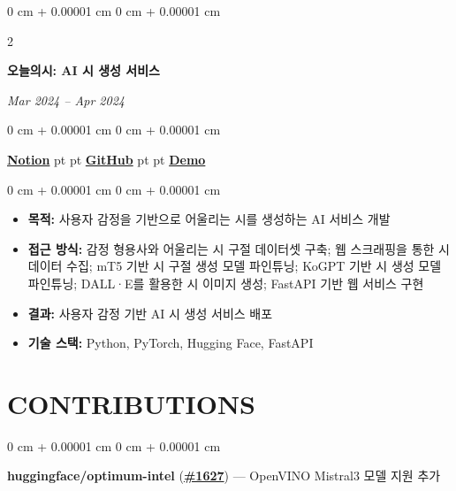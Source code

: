 \documentclass[10pt, letterpaper]{article}
\newenvironment{highlights}{
    \begin{itemize}[
        topsep=0.10 cm,
        parsep=0.10 cm,
        partopsep=0pt,
        itemsep=0pt,
        leftmargin=0 cm + 10pt
    ]
}{
    \end{itemize}
} %
\newenvironment{onecolentry}{
    \begin{adjustwidth}{
        0 cm + 0.00001 cm
    }{
        0 cm + 0.00001 cm
    }
}{
    \end{adjustwidth}
} %
\newenvironment{twocolentry}[2][]{
    \onecolentry
    \def\secondColumn{\textit{#2}}
    \setcolumnwidth{\fill, 4.5 cm}
    \begin{paracol}{2}
}{
    \switchcolumn \raggedleft \secondColumn
    \end{paracol}
    \endonecolentry
} %
\begin{document}
        \vspace{0.2 cm}
        \begin{twocolentry}{
            Mar 2024 -- Apr 2024
        }
            \textbf{오늘의시: AI 시 생성 서비스}
        \end{twocolentry}
        \begin{onecolentry}
            \href{https://awake-kumquat-803.notion.site/AI-1b674ec8f703804c9374e31d42b913a7?source=copy_link}{\textbf{Notion}}
             pt
            \AND
             pt
            \href{https://github.com/boostcampaitech6/level2-3-nlp-finalproject-nlp-05}{\textbf{GitHub}}
             pt
            \AND
             pt
            \href{https://drive.google.com/file/d/1Posof2hvXHmEOwdVl48xTVUwrTU4mYpS/view?usp=drive_link}{\textbf{Demo}}
        \end{onecolentry}

        \vspace{0.10 cm}
        \begin{onecolentry}
            \begin{highlights}
                \item \textbf{목적:} 사용자 감정을 기반으로 어울리는 시를 생성하는 AI 서비스 개발
                \item \textbf{접근 방식:} 감정 형용사와 어울리는 시 구절 데이터셋 구축; 웹 스크래핑을 통한 시 데이터 수집; mT5 기반 시 구절 생성 모델 파인튜닝; KoGPT 기반 시 생성 모델 파인튜닝; DALL·E를 활용한 시 이미지 생성; FastAPI 기반 웹 서비스 구현
                \item \textbf{결과:} 사용자 감정 기반 AI 시 생성 서비스 배포
                \item \textbf{기술 스택:} Python, PyTorch, Hugging Face, FastAPI
            \end{highlights}
        \end{onecolentry}

    \vspace{5 pt - 0.3 cm}
    \section{CONTRIBUTIONS}
        \begin{onecolentry}
            \textbf{huggingface/optimum-intel} (\href{https://github.com/huggingface/optimum-intel/pull/1627}{\textbf{\#1627}}) --- OpenVINO Mistral3 모델 지원 추가
        \end{onecolentry}

    \vspace{5 pt - 0.3 cm}
\end{document}
